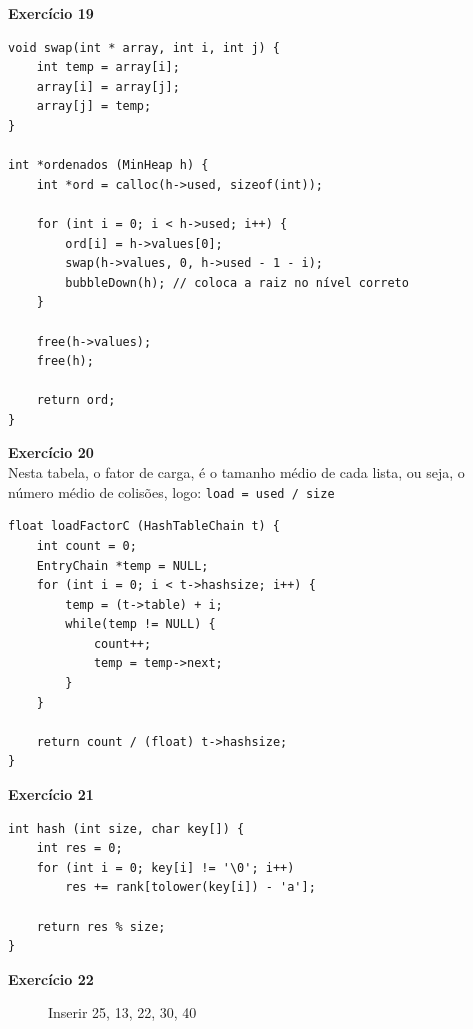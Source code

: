 \documentclass[a4paper,11pt]{article}
\begin{document}
\newpage

\noindent \textbf{Exercício 19}

\begin{verbatim}
void swap(int * array, int i, int j) {
	int temp = array[i];
	array[i] = array[j];
	array[j] = temp;
}

int *ordenados (MinHeap h) {
	int *ord = calloc(h->used, sizeof(int));
	
	for (int i = 0; i < h->used; i++) {
		ord[i] = h->values[0];
		swap(h->values, 0, h->used - 1 - i);
		bubbleDown(h); // coloca a raiz no nível correto
	}
	
	free(h->values);
	free(h);
	
	return ord;
}
\end{verbatim}

\noindent \textbf{Exercício 20}\\

\noindent Nesta tabela, o fator de carga, é o tamanho médio de cada lista, ou seja, o número médio de colisões, logo: \texttt{load = used / size}

\begin{verbatim}
float loadFactorC (HashTableChain t) {
	int count = 0;
	EntryChain *temp = NULL;
	for (int i = 0; i < t->hashsize; i++) {
		temp = (t->table) + i;
		while(temp != NULL) {
			count++;
			temp = temp->next;
		}
	}
	
	return count / (float) t->hashsize;
}
\end{verbatim}

\noindent \textbf{Exercício 21}

\begin{verbatim}
int hash (int size, char key[]) {
	int res = 0;
	for (int i = 0; key[i] != '\0'; i++)
		res += rank[tolower(key[i]) - 'a'];
	
	return res % size;
}
\end{verbatim}


\noindent \textbf{Exercício 22}

\begin{figure}[H]
	\centering
	\caption{Inserir 25, 13, 22, 30, 40}
\end{figure}
\end{document}
